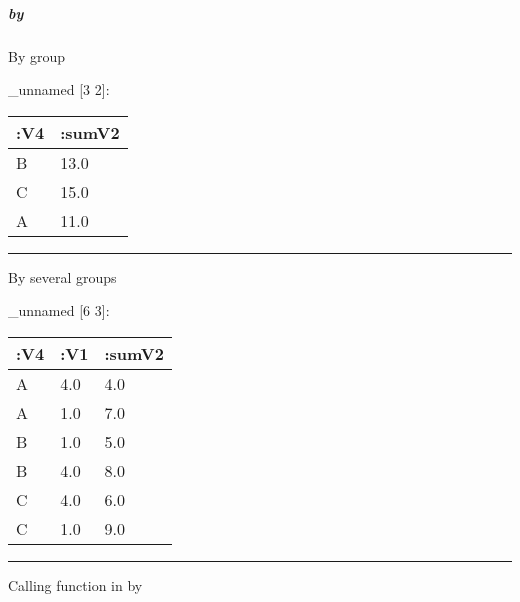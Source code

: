 \documentclass[]{article}
\newenvironment{Shaded}{\begin{snugshade}}{\end{snugshade}}
\newcommand{\AttributeTok}[1]{\textcolor[rgb]{0.77,0.63,0.00}{#1}}
\newcommand{\KeywordTok}[1]{\textcolor[rgb]{0.13,0.29,0.53}{\textbf{#1}}}
\newcommand{\NormalTok}[1]{#1}
\newcommand{\VariableTok}[1]{\textcolor[rgb]{0.00,0.00,0.00}{#1}}
\let\oldsubparagraph\subparagraph
\renewcommand{\subparagraph}[1]{\oldsubparagraph{#1}\mbox{}}
\begin{document}
\hypertarget{by}{%
\subparagraph{by}\label{by}}

By group

\begin{Shaded}
\end{Shaded}

\_unnamed {[}3 2{]}:

\begin{longtable}[]{@{}ll@{}}
\toprule
:V4 & :sumV2\tabularnewline
\midrule
\endhead
B & 13.0\tabularnewline
C & 15.0\tabularnewline
A & 11.0\tabularnewline
\bottomrule
\end{longtable}

\begin{center}\rule{0.5\linewidth}{0.5pt}\end{center}

By several groups

\begin{Shaded}
\end{Shaded}

\_unnamed {[}6 3{]}:

\begin{longtable}[]{@{}lll@{}}
\toprule
:V4 & :V1 & :sumV2\tabularnewline
\midrule
\endhead
A & 4.0 & 4.0\tabularnewline
A & 1.0 & 7.0\tabularnewline
B & 1.0 & 5.0\tabularnewline
B & 4.0 & 8.0\tabularnewline
C & 4.0 & 6.0\tabularnewline
C & 1.0 & 9.0\tabularnewline
\bottomrule
\end{longtable}

\begin{center}\rule{0.5\linewidth}{0.5pt}\end{center}

Calling function in by

\begin{Shaded}
\end{Shaded}
\end{document}
